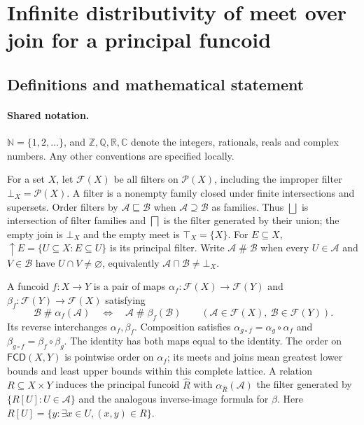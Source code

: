 \documentclass[11pt]{article}
\begin{document}
\section{Infinite distributivity of meet over join for a principal funcoid}\label{statement}

\subsection{Definitions and mathematical statement}

\paragraph{Shared notation.}$\mathbb N=\{1,2,\ldots\}$, and $\mathbb Z,\mathbb Q,\mathbb R,\mathbb C$ denote the integers, rationals, reals and complex numbers. Any other conventions are specified locally.


For a set $X$, let $\mathcal F(X)$ be all filters on $\mathcal P(X)$, including the improper filter $\bot_X=\mathcal P(X)$. A filter is a nonempty family closed under finite intersections and supersets. Order filters by $\mathcal A\sqsubseteq\mathcal B$ when $\mathcal A\supseteq\mathcal B$ as families. Thus $\bigsqcup$ is intersection of filter families and $\bigsqcap$ is the filter generated by their union; the empty join is $\bot_X$ and the empty meet is $\top_X=\{X\}$. For $E\subseteq X$, $\uparrow E=\{U\subseteq X:E\subseteq U\}$ is its principal filter. Write $\mathcal A\mathrel{\#}\mathcal B$ when every $U\in\mathcal A$ and $V\in\mathcal B$ have $U\cap V\ne\varnothing$, equivalently $\mathcal A\sqcap\mathcal B\ne\bot_X$.

A funcoid $f:X\to Y$ is a pair of maps $\alpha_f:\mathcal F(X)\to\mathcal F(Y)$ and $\beta_f:\mathcal F(Y)\to\mathcal F(X)$ satisfying
\[
 \mathcal B\mathrel{\#}\alpha_f(\mathcal A)
 \quad\Longleftrightarrow\quad
 \mathcal A\mathrel{\#}\beta_f(\mathcal B)
 \qquad(\mathcal A\in\mathcal F(X),\ \mathcal B\in\mathcal F(Y)).
\]
Its reverse interchanges $\alpha_f,\beta_f$. Composition satisfies $\alpha_{g\circ f}=\alpha_g\circ\alpha_f$ and $\beta_{g\circ f}=\beta_f\circ\beta_g$. The identity has both maps equal to the identity. The order on $\mathsf{FCD}(X,Y)$ is pointwise order on $\alpha_f$; its meets and joins mean greatest lower bounds and least upper bounds within this complete lattice. A relation $R\subseteq X\times Y$ induces the principal funcoid $\widehat R$ with $\alpha_{\widehat R}(\mathcal A)$ the filter generated by $\{R[U]:U\in\mathcal A\}$ and the analogous inverse-image formula for $\beta$. Here $R[U]=\{y:\exists x\in U,(x,y)\in R\}$.
\end{document}

